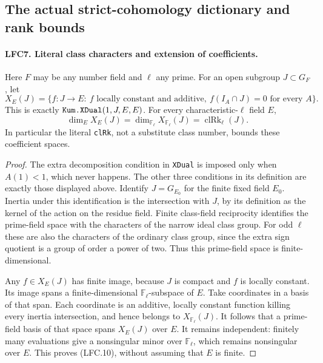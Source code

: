 \documentclass[11pt,a4paper]{article}
\numberwithin{equation}{section}
\theoremstyle{remark}\newtheorem{remark}[theorem]{Remark}
\begin{document}
\subsection{The actual strict-cohomology dictionary and rank bounds}

\paragraph{LFC7. Literal class characters and extension of coefficients.}
\label{claim:LFC7}
Here \(F\) may be any number field and \(\ell\) any prime.
For an open subgroup \(J\subset G_F\), let
\[
 X_E(J)=\{f:J\to E:\ f\text{ locally constant and additive},
                   \ f(I_A\cap J)=0\text{ for every }A\}.
 \]
This is exactly \(\texttt{Kum.\allowbreak XDual}(1,J,E,E)\).
For every characteristic-\(\ell\) field \(E\),
\[
 \dim_E X_E(J)=\dim_{\mathbb F_\ell}X_{\mathbb F_\ell}(J)
                  =\operatorname{clRk}_\ell(J).           \tag{LFC.10}
\]
In particular the literal \texttt{cl\allowbreak Rk}, not a substitute
class number, bounds these coefficient spaces.

\begin{proof}
The extra decomposition condition in \texttt{XDual} is
imposed only when \(A(1)<1\), which never happens.
The other three conditions in its definition are exactly
those displayed above.  Identify \(J=G_{E_0}\) for the finite
fixed field \(E_0\).  Inertia under this identification is
the intersection with \(J\), by its definition as the
kernel of the action on the residue field.
Finite class-field reciprocity identifies the prime-field
space with the characters of the narrow ideal class group.
For odd \(\ell\) these are also the characters of the
ordinary class group, since the extra sign quotient is
a group of order a power of two.
Thus this prime-field space is finite-dimensional.

Any \(f\in X_E(J)\) has finite image, because \(J\) is
compact and \(f\) is locally constant.  Its image spans a
finite-dimensional \(\mathbb F_\ell\)-subspace of \(E\).
Take coordinates in a basis of that span.  Each coordinate
is an additive, locally constant function killing every
inertia intersection, and hence belongs to
\(X_{\mathbb F_\ell}(J)\).
It follows that a prime-field basis of that space spans
\(X_E(J)\) over \(E\).  It remains independent: finitely
many evaluations give a nonsingular minor over
\(\mathbb F_\ell\), which remains nonsingular over \(E\).
This proves (LFC.10), without assuming that \(E\) is finite.
\end{proof}
\end{document}
